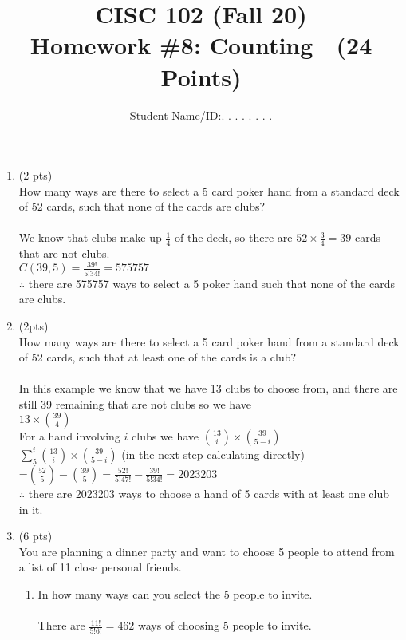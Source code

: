 \documentclass[12pt]{article}
\title{CISC 102 (Fall 20)\\ Homework \#8: Counting $\;$   (24 Points) }
\author{Student Name/ID:. . . . . . . .}
\date{}
\begin{document}
\maketitle

\begin{enumerate}

\item (2 pts) \\
How many ways are there to select a 5 card poker hand from a standard deck of 52 cards, such that none of the cards are clubs?\\
\\We know that clubs make up $\frac{1}{4}$ of the deck, so there are $52\times \frac{3}{4}=39$ cards that are not clubs.
\\$C(39,5)= \frac{39!}{5!34!} = 575757$
\\$\therefore$ there are 575757 ways to select a 5 poker hand such that none of the cards are clubs.

\item (2pts) \\
How many ways are there to select a 5 card poker hand  from a standard deck of 52 cards, such that at least one of the cards is a club?\\
\\In this example we know that we have 13 clubs to choose from, and there are still 39 remaining that are not clubs so we have
\\$13 \times \binom{39}{4}$
\\For a hand involving $i$ clubs we have $\binom{13}{i} \times \binom{39}{5-i}$
\\$\sum_{5}^{i} \binom{13}{i} \times \binom{39}{5-i}$ (in the next step calculating directly)
\\=$\binom{52}{5} - \binom{39}{5} = \frac{52!}{5!47!} - \frac{39!}{5!34!} = 2023203$
\\$\therefore$ there are 2023203 ways to choose a hand of 5 cards with at least one club in it.

\item (6 pts)\\
You are planning a dinner party and want to choose 5 people to attend from a list of 11 close personal friends.
\begin{enumerate}
	\item In how many ways can you select the 5 people to invite.\\
    \\There are $\frac{11!}{5!6!} = 462$ ways of choosing 5 people to invite.
		

\end{enumerate}
\end{enumerate}
\end{document}
